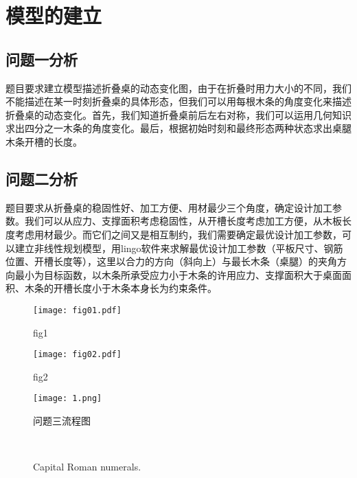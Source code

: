\documentclass[bwprint]{gmcmthesis}
\numberwithin{equation}{section}
\numberwithin{figure}{section}
\numberwithin{table}{section}
\begin{document}


\section{模型的建立}

\subsection{问题一分析}
题目要求建立模型描述折叠桌的动态变化图，由于在折叠时用力大小的不同，我们不能描述在某一时刻折叠桌的具体形态，但我们可以用每根木条的角度变化来描述折叠桌的动态变化。首先，我们知道折叠桌前后左右对称，我们可以运用几何知识求出四分之一木条的角度变化。最后，根据初始时刻和最终形态两种状态求出桌腿木条开槽的长度。


\subsection{问题二分析}
题目要求从折叠桌的稳固性好、加工方便、用材最少三个角度，确定设计加工参数。我们可以从应力、支撑面积考虑稳固性，从开槽长度考虑加工方便，从木板长度考虑用材最少。而它们之间又是相互制约，我们需要确定最优设计加工参数，可以建立非线性规划模型，用lingo软件来求解最优设计加工参数（平板尺寸、钢筋位置、开槽长度等），这里以合力的方向（斜向上）与最长木条（桌腿）的夹角方向最小为目标函数，以木条所承受应力小于木条的许用应力、支撑面积大于桌面面积、木条的开槽长度小于木条本身长为约束条件。
\begin{figure}[!htp]
\begin{minipage}[t]{0.5\linewidth}
\centering
\texttt{[image: fig01.pdf]}
\caption{fig1}
\label{fig:side:a}
\end{minipage}%
\begin{minipage}[t]{0.5\linewidth}
\centering
\texttt{[image: fig02.pdf]}  %
\caption{fig2}
\label{fig:side:b}
\end{minipage}
\end{figure}

\begin{figure}[!htp]
\centering
\texttt{[image: 1.png]}
\caption{问题三流程图}
\end{figure}

\clearpage
\begin{figure}[!htp]
	\centering
	 \\
	\caption{Capital Roman numerals.}
\end{figure}
\end{document}
